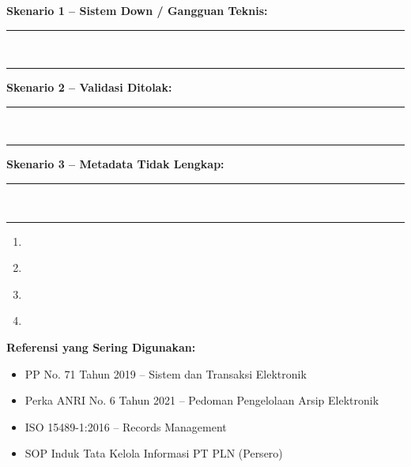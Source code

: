 \documentclass[12pt,a4paper]{report}
\newcommand{\fillline}[1][6cm]{\underline{\hspace{#1}}}
\newcommand{\writespace}[1][2cm]{\rule{0pt}{#1}}
\begin{document}
\vspace{0.2cm}

\begin{tcolorbox}[colback=plnorange!5, colframe=plnorange!60, sharp corners, title={\small\bfseries Komponen 6: Exception Handling \& Fallback}, boxrule=0.8pt]
\noindent\textbf{Skenario 1 -- Sistem Down / Gangguan Teknis:}\\
\rule{\textwidth}{0.3pt}\writespace[0.7cm]\\
\rule{\textwidth}{0.3pt}\writespace[0.5cm]

\vspace{0.2cm}
\noindent\textbf{Skenario 2 -- Validasi Ditolak:}\\
\rule{\textwidth}{0.3pt}\writespace[0.7cm]\\
\rule{\textwidth}{0.3pt}\writespace[0.5cm]

\vspace{0.2cm}
\noindent\textbf{Skenario 3 -- Metadata Tidak Lengkap:}\\
\rule{\textwidth}{0.3pt}\writespace[0.7cm]\\
\rule{\textwidth}{0.3pt}
\end{tcolorbox}

\vspace{0.2cm}

\begin{tcolorbox}[colback=plnblue!3, colframe=plnblue!60, sharp corners, title={\small\bfseries Komponen 7: Referensi Regulasi \& Standar}, boxrule=0.8pt]
\begin{enumerate}
    \item \fillline[12cm]
    \item \fillline[12cm]
    \item \fillline[12cm]
    \item \fillline[12cm]
\end{enumerate}
\end{tcolorbox}

\vspace{0.4cm}

\begin{tipbox}
\textbf{Referensi yang Sering Digunakan:}
\begin{itemize}
    \item PP No. 71 Tahun 2019 -- Sistem dan Transaksi Elektronik
    \item Perka ANRI No. 6 Tahun 2021 -- Pedoman Pengelolaan Arsip Elektronik
    \item ISO 15489-1:2016 -- Records Management
    \item SOP Induk Tata Kelola Informasi PT PLN (Persero)
\end{itemize}
\end{tipbox}
\end{document}
